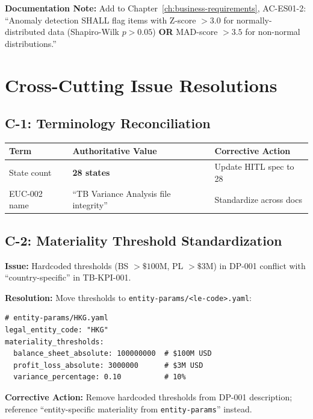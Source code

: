 \textbf{Documentation Note:} Add to Chapter~\ref{ch:business-requirements}, 
AC-ES01-2: ``Anomaly detection SHALL flag items with Z-score $> 3.0$ for 
normally-distributed data (Shapiro-Wilk $p > 0.05$) \textbf{OR} MAD-score 
$> 3.5$ for non-normal distributions.''

\section{Cross-Cutting Issue Resolutions}
\label{sec:cross-cutting}

\subsection{C-1: Terminology Reconciliation}
\label{sec:c1-terminology}

\begin{tabular}{lll}
\toprule
\textbf{Term} & \textbf{Authoritative Value} & \textbf{Corrective Action} \\
\midrule
State count & \textbf{28 states} & Update HITL spec to 28 \\
EUC-002 name & ``TB Variance Analysis file integrity'' & Standardize across docs \\
\bottomrule
\end{tabular}

\subsection{C-2: Materiality Threshold Standardization}
\label{sec:c2-materiality}

\begin{tcolorbox}[colback=blue!5,colframe=blue!70,title=Resolution: Entity-Params Configuration]
\textbf{Issue:} Hardcoded thresholds (BS $> \$100$M, PL $> \$3$M) in DP-001 
conflict with ``country-specific'' in TB-KPI-001.

\textbf{Resolution:} Move thresholds to \texttt{entity-params/<le-code>.yaml}:
\begin{lstlisting}[language=yamlx]
# entity-params/HKG.yaml
legal_entity_code: "HKG"
materiality_thresholds:
  balance_sheet_absolute: 100000000  # $100M USD
  profit_loss_absolute: 3000000      # $3M USD
  variance_percentage: 0.10          # 10%
\end{lstlisting}

\textbf{Corrective Action:} Remove hardcoded thresholds from DP-001 description; 
reference ``entity-specific materiality from \texttt{entity-params}'' instead.
\end{tcolorbox}

